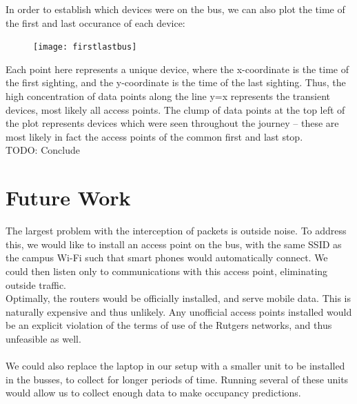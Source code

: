\documentclass[letterpaper]{scrartcl}
\begin{document}
	In order to establish which devices were on the bus, we can also plot the time of the first and last occurance of each device:


	\begin{figure}[H]
	\texttt{[image: firstlastbus]}
	\centering
	\end{figure}

	Each point here represents a unique device, where the x-coordinate is the time of the first sighting, and the y-coordinate is the time of the last sighting.
	Thus, the high concentration of data points along the line y=x represents the transient devices, most likely all access points.
	The clump of data points at the top left of the plot represents devices which were seen throughout the journey -- these are most likely in fact the access points of the common first and last stop.
	\\

	TODO: Conclude


\section*{Future Work}
The largest problem with the interception of packets is outside noise.
To address this, we would like to install an access point on the bus, with the same SSID as the campus Wi-Fi such that smart phones would automatically connect.
We could then listen only to communications with this access point, eliminating outside traffic.
\\
Optimally, the routers would be officially installed, and serve mobile data. This is naturally expensive and thus unlikely. Any unofficial access points installed would be an explicit violation of the terms of use of the Rutgers networks, and thus unfeasible as well.
\\
\\
We could also replace the laptop in our setup with a smaller unit to be installed in the busses, to collect for longer periods of time. Running several of these units would allow us to collect enough data to make occupancy predictions.
\end{document}
